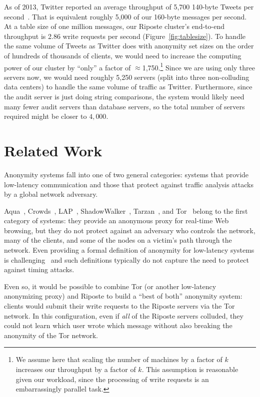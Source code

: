 \documentclass[10pt,twocolumn]{article}
\newcommand{\name}{Riposte\xspace}
\begin{document}
As of 2013, Twitter reported an average throughput of
5,700 140-byte Tweets per second~\cite{krikorian2013new}.
That is equivalent roughly 5,000 of our 160-byte messages per second.
At a table size of one million messages, our \name cluster's 
end-to-end throughput is 2.86 write requests per second (Figure~\ref{fig:tablesize}).
To handle the same volume of Tweets as Twitter does with
anonymity set sizes on the order of hundreds of thousands of clients, 
we would need to increase the computing power of our cluster by ``only''
a factor of $\approx$1,750.\footnote{
We assume here that scaling the number of machines
by a factor of $k$ increases our throughput by a factor of $k$.
This assumption is reasonable given our workload, since 
the processing of write requests is an embarrassingly parallel task.
}
Since we are using only three servers now, we would need
roughly 5,250 servers (split into three non-colluding data centers)
to handle the same volume of traffic as Twitter. 
Furthermore, since the audit server is just doing string comparisons,
the system would likely need many fewer audit servers than database servers,
so the total number of servers required might be closer to $4,000$.

 \section{Related Work}
\label{sec:rel}

Anonymity systems fall into one of two general categories: systems that provide
low-latency communication and those that protect against traffic analysis
attacks by a global network adversary.

Aqua~\cite{leblond2013towards}, 
Crowds~\cite{reiter1998crowds}, 
LAP~\cite{hsiao2012lap}, 
ShadowWalker~\cite{mittal2009shadowwalker},
Tarzan~\cite{freedman2002tarzan}, and
Tor~\cite{dingledine2004tor} 
belong to the first category of systems: 
they provide an anonymous proxy for 
real-time Web browsing, but they
do not protect against an adversary 
who controls the network, many of
the clients, and some of the nodes
on a victim's path through the network.
Even providing a formal 
definition of anonymity for low-latency systems
is challenging~\cite{johnson2009design} and such
definitions typically do not capture the need to 
protect against timing attacks.

Even so, it would be possible to combine 
Tor (or another low-latency anonymizing proxy) and \name
to build a ``best of both'' anonymity system: clients would submit
their write requests to the \name servers via the Tor network.
In this configuration, even if {\em all} of the \name servers
colluded, they could not learn which user wrote which message
without also breaking the anonymity of the Tor network.
\end{document}
